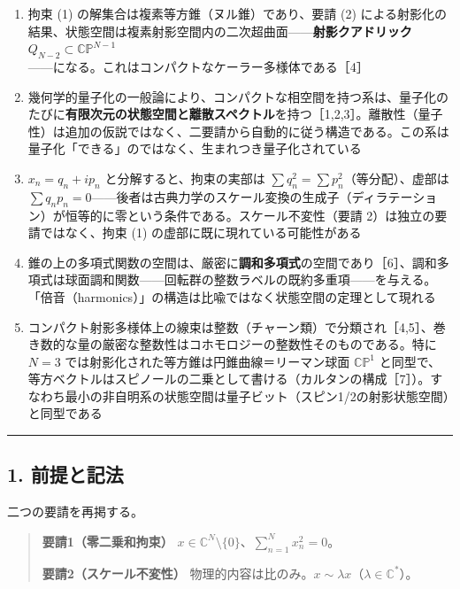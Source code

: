 \documentclass[
  a4paper,
]{ltjsarticle}
\providecommand{\tightlist}{%
  \setlength{\itemsep}{0pt}\setlength{\parskip}{0pt}}
\begin{document}
\begin{enumerate}
\def\labelenumi{\arabic{enumi}.}
\tightlist
\item
  拘束 (1) の解集合は複素等方錐（ヌル錐）であり、要請 (2)
  による射影化の結果、状態空間は複素射影空間内の二次超曲面------\textbf{射影クアドリック}
  \(Q_{N-2}\subset\mathbb{CP}^{N-1}\)------になる。これはコンパクトなケーラー多様体である［4］
\item
  幾何学的量子化の一般論により、コンパクトな相空間を持つ系は、量子化のたびに\textbf{有限次元の状態空間と離散スペクトル}を持つ［1,2,3］。離散性（量子性）は追加の仮説ではなく、二要請から自動的に従う構造である。この系は量子化「できる」のではなく、生まれつき量子化されている
\item
  \(x_n=q_n+ip_n\) と分解すると、拘束の実部は
  \(\sum q_n^2=\sum p_n^2\)（等分配）、虚部は
  \(\sum q_np_n=0\)------後者は古典力学のスケール変換の生成子（ディラテーション）が恒等的に零という条件である。スケール不変性（要請
  2）は独立の要請ではなく、拘束 (1) の虚部に既に現れている可能性がある
\item
  錐の上の多項式関数の空間は、厳密に\textbf{調和多項式}の空間であり［6］、調和多項式は球面調和関数------回転群の整数ラベルの既約多重項------を与える。「倍音（harmonics）」の構造は比喩ではなく状態空間の定理として現れる
\item
  コンパクト射影多様体上の線束は整数（チャーン類）で分類され［4,5］、巻き数的な量の厳密な整数性はコホモロジーの整数性そのものである。特に
  \(N=3\) では射影化された等方錐は円錐曲線＝リーマン球面
  \(\mathbb{CP}^1\)
  と同型で、等方ベクトルはスピノールの二乗として書ける（カルタンの構成［7］）。すなわち最小の非自明系の状態空間は量子ビット（スピン1/2の射影状態空間）と同型である
\end{enumerate}

\begin{center}\rule{0.5\linewidth}{0.5pt}\end{center}

\subsection{1. 前提と記法}\label{ux524dux63d0ux3068ux8a18ux6cd5}

二つの要請を再掲する。

\begin{quote}
\textbf{要請1（零二乗和拘束）}
\(x\in\mathbb C^N\setminus\{0\}\)、\(\displaystyle\sum_{n=1}^N x_n^2=0\)。

\textbf{要請2（スケール不変性）}
物理的内容は比のみ。\(x\sim\lambda x\)（\(\lambda\in\mathbb C^\ast\)）。
\end{quote}
\end{document}
